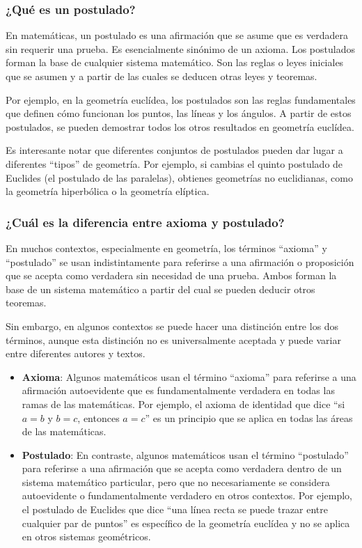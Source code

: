 \subsubsection{¿Qué es un postulado?}

En matemáticas, un postulado es una afirmación que se asume que es verdadera sin requerir una prueba. Es esencialmente sinónimo de un axioma. Los postulados forman la base de cualquier sistema matemático. Son las reglas o leyes iniciales que se asumen y a partir de las cuales se deducen otras leyes y teoremas.

Por ejemplo, en la geometría euclídea, los postulados son las reglas fundamentales que definen cómo funcionan los puntos, las líneas y los ángulos. A partir de estos postulados, se pueden demostrar todos los otros resultados en geometría euclídea.

Es interesante notar que diferentes conjuntos de postulados pueden dar lugar a diferentes ``tipos'' de geometría. Por ejemplo, si cambias el quinto postulado de Euclides (el postulado de las paralelas), obtienes geometrías no euclidianas, como la geometría hiperbólica o la geometría elíptica.

\subsubsection{¿Cuál es la diferencia entre axioma y postulado?}

En muchos contextos, especialmente en geometría, los términos ``axioma'' y ``postulado'' se usan indistintamente para referirse a una afirmación o proposición que se acepta como verdadera sin necesidad de una prueba. Ambos forman la base de un sistema matemático a partir del cual se pueden deducir otros teoremas.

Sin embargo, en algunos contextos se puede hacer una distinción entre los dos términos, aunque esta distinción no es universalmente aceptada y puede variar entre diferentes autores y textos.

\begin{itemize}
    \item \textbf{Axioma}: Algunos matemáticos usan el término ``axioma'' para referirse a una afirmación autoevidente que es fundamentalmente verdadera en todas las ramas de las matemáticas. Por ejemplo, el axioma de identidad que dice ``si $a = b$ y $b = c$, entonces $a = c$'' es un principio que se aplica en todas las áreas de las matemáticas.
    \item \textbf{Postulado}: En contraste, algunos matemáticos usan el término ``postulado'' para referirse a una afirmación que se acepta como verdadera dentro de un sistema matemático particular, pero que no necesariamente se considera autoevidente o fundamentalmente verdadero en otros contextos. Por ejemplo, el postulado de Euclides que dice ``una línea recta se puede trazar entre cualquier par de puntos'' es específico de la geometría euclídea y no se aplica en otros sistemas geométricos.
\end{itemize}

